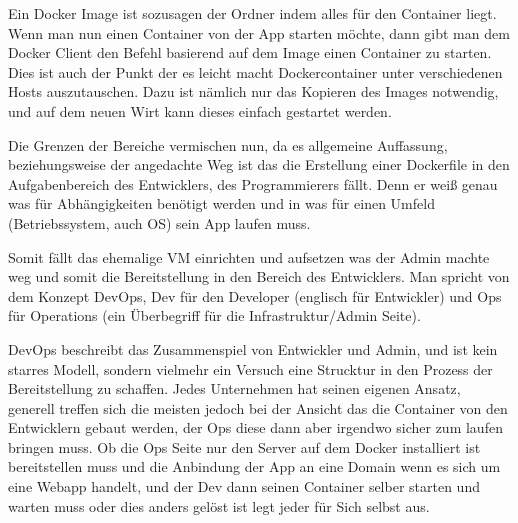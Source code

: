 Ein Docker Image ist sozusagen der Ordner indem alles für den Container liegt. Wenn man nun einen Container von der App starten möchte, dann gibt man dem Docker Client den Befehl basierend auf dem Image einen Container zu starten.
Dies ist auch der Punkt der es leicht macht Dockercontainer unter verschiedenen Hosts auszutauschen. Dazu ist nämlich nur das Kopieren des Images notwendig, und auf dem neuen Wirt kann dieses einfach gestartet werden.

Die Grenzen der Bereiche vermischen nun, da es allgemeine Auffassung, beziehungsweise der angedachte Weg ist das die Erstellung einer Dockerfile in den Aufgabenbereich
des Entwicklers, des Programmierers fällt. Denn er weiß genau was für Abhängigkeiten benötigt werden und in was für einen Umfeld (Betriebssystem, auch OS) sein App laufen muss.

Somit fällt das ehemalige VM einrichten und aufsetzen was der Admin machte weg und somit die Bereitstellung in den Bereich des Entwicklers.
Man spricht von dem Konzept DevOps, Dev für den Developer (englisch für Entwickler) und Ops für Operations (ein Überbegriff für die Infrastruktur/Admin Seite).

DevOps beschreibt das Zusammenspiel von Entwickler und Admin, und ist kein starres Modell, sondern vielmehr ein Versuch eine Strucktur in den Prozess der Bereitstellung zu schaffen.
Jedes Unternehmen hat seinen eigenen Ansatz, generell treffen sich die meisten jedoch bei der Ansicht das die Container von den Entwicklern gebaut werden, der Ops diese dann aber irgendwo sicher zum laufen bringen muss.
Ob die Ops Seite nur den Server auf dem Docker installiert ist bereitstellen muss und die Anbindung der App an eine Domain wenn es sich um eine Webapp handelt, und der Dev dann seinen Container selber starten und warten muss oder dies anders gelöst ist legt jeder für Sich selbst aus.
